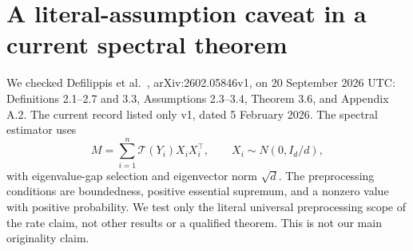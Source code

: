 \section{A literal-assumption caveat in a current spectral theorem}
\label{app:source}

We checked Defilippis et al.~\cite{defilippis}, arXiv:2602.05846v1,
on 20 September 2026 UTC: Definitions 2.1--2.7 and 3.3,
Assumptions 2.3--3.4, Theorem 3.6, and Appendix A.2. The current record
listed only v1, dated 5 February 2026. The spectral estimator uses
\[
 M=\sum_{i=1}^n\mathcal T(Y_i)X_iX_i^\top,
 \qquad X_i\sim N(0,I_d/d),
\]
with eigenvalue-gap selection and eigenvector norm $\sqrt d$.
The preprocessing conditions are boundedness, positive essential
supremum, and a nonzero value with positive probability. We test only
the literal universal preprocessing scope of the rate claim, not other
results or a qualified theorem. This is not our main originality claim.

